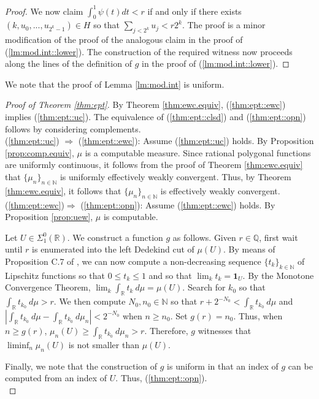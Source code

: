 \documentclass{amsart}
\newcommand{\Q}{\mathbb{Q}}
\newcommand{\R}{\mathbb{R}}
\newcommand{\N}{\mathbb{N}}
\newcommand{\one}{\mathbf{1}}
\theoremstyle{definition}
\numberwithin{equation}{section}
\begin{document}
\begin{proof}
We now claim $\int_0^1\psi(t)dt<r$ if and only if there exists $(k,u_0,...,u_{2^k-1})\in H$ so that $\sum_{j<2^k}u_j<r2^k$. 
The proof is a minor modification of the proof of the analogous claim in the proof of (\ref{lm:mod.int::lower}).  
The construction of the required witness now proceeds along the lines of the definition of $g$ in the proof of 
(\ref{lm:mod.int::lower}).
\end{proof}

We note that the proof of Lemma \ref{lm:mod.int} is uniform.

\begin{proof}[Proof of Theorem \ref{thm:ept}]
By Theorem \ref{thm:ewc.equiv}, (\ref{thm:ept::ewc}) implies (\ref{thm:ept::uc}).  The equivalence of (\ref{thm:ept::clsd}) and 
(\ref{thm:ept::opn}) follows by considering complements.\\

(\ref{thm:ept::uc}) $\Rightarrow$ (\ref{thm:ept::ewc}): Assume (\ref{thm:ept::uc}) holds. 
By Proposition \ref{prop:comp.equiv}, $\mu$ is a computable measure. 
Since rational polygonal functions are uniformly continuous, 
it follows from the proof of Theorem \ref{thm:ewc.equiv} that $\{\mu_n\}_{n \in \N}$ is uniformly effectively weakly convergent.  
Thus, by Theorem \ref{thm:ewc.equiv}, it follows that $\{\mu_n\}_{n\in\N}$ is effectively weakly convergent.\\

(\ref{thm:ept::ewc})$\Rightarrow$ (\ref{thm:ept::opn}): Assume (\ref{thm:ept::ewc}) holds. 
By Proposition \ref{prop:uew}, $\mu$ is computable.   

Let $U \in \Sigma^0_1(\R)$.  
We construct a function $g$ as follows.  
Given $r \in \Q$, first wait until $r$ is enumerated into the left Dedekind cut of $\mu(U)$.  
By means of Proposition C.7 of \cite{G05}, we can now compute a non-decreasing sequence $\{t_k\}_{k \in \N}$ of Lipschitz functions so that $0 \leq t_k \leq 1$ and so that $\lim_k t_k = \one_U$.  
 By the Monotone Convergence Theorem, $\lim_k \int_\R t_k\ d\mu = \mu(U)$.  Search for $k_0$ so that $\int_\R t_{k_0}\ d\mu > r$.  We then compute $N_0, n_0 \in \N$ so that 
$r + 2^{-N_0} < \int_\R t_{k_0}\ d\mu$ and 
$|\int_\R t_{k_0}\ d\mu - \int_\R t_{k_0}\ d\mu_n| < 2^{-N_0}$ when $n \geq n_0$.  Set $g(r) = n_0$.  Thus, when 
$n \geq g(r)$, $\mu_n(U) \geq \int_\R t_{k_0}\ d\mu_n > r$.  Therefore, $g$ witnesses that $\liminf_n \mu_n(U)$ is not smaller than $\mu(U)$.

Finally, we note that the construction of $g$ is uniform in that an index of $g$ can be computed from an index of $U$.  Thus, (\ref{thm:ept::opn}).\\


\end{proof}
\end{document}
